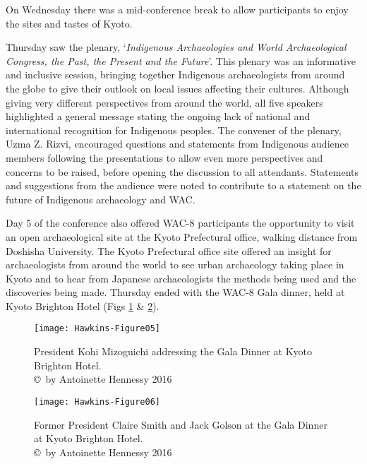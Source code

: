 On Wednesday there was a mid-conference break to allow participants to enjoy the sites and tastes of Kyoto. 

Thursday saw the plenary, ‘\textit{Indigenous Archaeologies and World Archaeological Congress, the Past, the Present and the Future}’. This plenary was an informative and inclusive session, bringing together Indigenous archaeologists from around the globe to give their outlook on local issues affecting their cultures. Although giving very different perspectives from around the world, all five speakers highlighted a general message stating the ongoing lack of national and international recognition for Indigenous peoples. The convener of the plenary, Uzma Z. Rizvi, encouraged questions and statements from Indigenous audience members following the presentations to allow even more perspectives and concerns to be raised, before opening the discussion to all attendants. Statements and suggestions from the audience were noted to contribute to a statement on the future of Indigenous archaeology and WAC.  

Day 5 of the conference also offered WAC-8 participants the opportunity to visit an open archaeological site at the Kyoto Prefectural office, walking distance from Doshisha University. The Kyoto Prefectural office site offered an insight for archaeologists from around the world to see urban archaeology taking place in Kyoto and to hear from Japanese archaeologists the methods being used and the discoveries being made. Thursday ended with the WAC-8 Gala dinner, held at Kyoto Brighton Hotel (Figs \ref{fig:Hawkins-Figure05} \& \ref{fig:Hawkins-Figure06}). 

\begin{figure}[!htb] %
	\centering
	\texttt{[image: Hawkins-Figure05]}
	\caption{President Kohi Mizoguichi addressing the Gala Dinner at Kyoto Brighton Hotel. 
		{\normalfont\scriptsize \\ \copyright\ by Antoinette Hennessy 2016}}
	\label{fig:Hawkins-Figure05}
\end{figure}

\begin{figure}[!htb] %
	\centering
	\texttt{[image: Hawkins-Figure06]}
	\caption{Former President Claire Smith and Jack Golson at the Gala Dinner at Kyoto Brighton Hotel. 
		{\normalfont\scriptsize \\ \copyright\ by Antoinette Hennessy 2016}}
	\label{fig:Hawkins-Figure06}
\end{figure}

